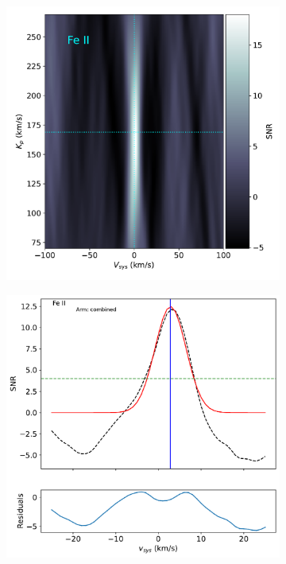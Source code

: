 \documentclass[twocolumn]{aastex631}
\begin{document}
\begin{figure}[ht!]
\begin{subfigure}[b]{0.4\textwidth}
            \caption{}\label{fig:1d-ccf-Fe-combined}
            \end{subfigure}
           
        
            \begin{subfigure}[b]{0.4\textwidth}
                \includegraphics[width=\textwidth]{plots-updated/kp-vsys-map/combined/KELT-20b.20190504.combined.Fe+.CCFs-shifted.pdf}
                \caption{}\label{fig:2d-ccf-Fe+-combined}
            \end{subfigure}
            \begin{subfigure}[b]{0.4\textwidth}
                \includegraphics[width=\textwidth]{plots-updated/line-profile/combined/KELT-20b.20190504.combined.Fe+.SNR-Gaussian.pdf}

\end{subfigure}
\end{figure}
\end{document}

